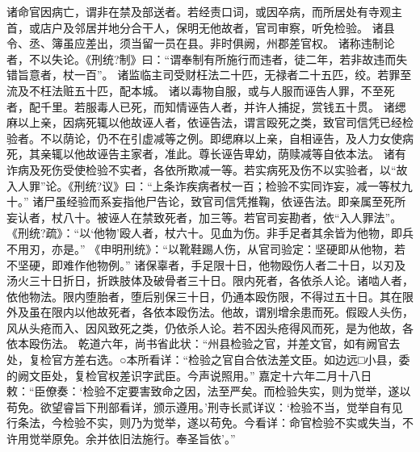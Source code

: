 \documentclass[12pt,UTF8]{ctexbook}
\begin{document}
诸命官因病亡，谓非在禁及部送者。若经责口词，或因卒病，而所居处有寺观主首，或店户及邻居并地分合干人，保明无他故者，官司审察，听免检验。
诸县令、丞、簿虽应差出，须当留一员在县。非时俱阙，州郡差官权。
诸称违制论者，不以失论。《刑统?制》曰：“谓奉制有所施行而违者，徒二年，若非故违而失错旨意者，杖一百”。
诸监临主司受财枉法二十匹，无禄者二十五匹，绞。若罪至流及不枉法赃五十匹，配本城。
诸以毒物自服，或与人服而诬告人罪，不至死者，配千里。若服毒人已死，而知情诬告人者，并许人捕捉，赏钱五十贯。
诸缌麻以上亲，因病死辄以他故诬人者，依诬告法，谓言殴死之类，致官司信凭已经检验者。不以荫论，仍不在引虚减等之例。即缌麻以上亲，自相诬告，及人力女使病死，其亲辄以他故诬告主家者，准此。尊长诬告卑幼，荫赎减等自依本法。
诸有诈病及死伤受使检验不实者，各依所欺减一等。若实病死及伤不以实验者，以“故入人罪”论。《刑统?议》曰：“上条诈疾病者杖一百；检验不实同诈妄，减一等杖九十。”
诸尸虽经验而系妄指他尸告论，致官司信凭推鞠，依诬告法。即亲属至死所妄认者，杖八十。被诬人在禁致死者，加三等。若官司妄勘者，依“入人罪法”。
《刑统?疏》：“以‘他物’殴人者，杖六十。见血为伤。非手足者其余皆为他物，即兵不用刃，亦是。”
《申明刑统》：“以靴鞋踢人伤，从官司验定：坚硬即从他物，若不坚硬，即难作他物例。”
诸保辜者，手足限十日，他物殴伤人者二十日，以刃及汤火三十日折日，折跌肢体及破骨者三十日。限内死者，各依杀人论。诸啮人者，依他物法。限内堕胎者，堕后别保三十日，仍通本殴伤限，不得过五十日。其在限外及虽在限内以他故死者，各依本殴伤法。他故，谓别增余患而死。假殴人头伤，风从头疮而入、因风致死之类，仍依杀人论。若不因头疮得风而死，是为他故，各依本殴伤法。
乾道六年，尚书省此状：“州县检验之官，并差文官，如有阙官去处，复检官方差右选。○本所看详：“检验之官自合依法差文臣。如边远□小县，委的阙文臣处，复检官权差识字武臣。今声说照用。”
嘉定十六年二月十八日
敕：“臣僚奏：‘检验不定要害致命之因，法至严矣。而检验失实，则为觉举，遂以苟免。欲望睿旨下刑部看详，颁示遵用。’刑寺长贰详议：‘检验不当，觉举自有见行条法，今检验不实，则乃为觉举，遂以苟免。今看详：命官检验不实或失当，不许用觉举原免。余并依旧法施行。奉圣旨依’。”
\end{document}
